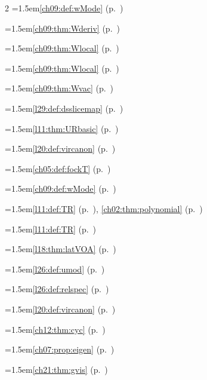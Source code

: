 \begin{multicols}{2}
\hangindent=1.5em\quad \ref{ch09:def:wMode} (p.~\pageref{ch09:def:wMode})\par
\hangindent=1.5em\quad \ref{ch09:thm:Wderiv} (p.~\pageref{ch09:thm:Wderiv})\par
\hangindent=1.5em\quad \ref{ch09:thm:Wlocal} (p.~\pageref{ch09:thm:Wlocal})\par
\hangindent=1.5em\quad \ref{ch09:thm:Wlocal} (p.~\pageref{ch09:thm:Wlocal})\par
\hangindent=1.5em\quad \ref{ch09:thm:Wvac} (p.~\pageref{ch09:thm:Wvac})\par
\hangindent=1.5em\quad \ref{l29:def:dsslicemap} (p.~\pageref{l29:def:dsslicemap})\par
\hangindent=1.5em\quad \ref{l11:thm:URbasic} (p.~\pageref{l11:thm:URbasic})\par
\hangindent=1.5em\quad \ref{l20:def:vircanon} (p.~\pageref{l20:def:vircanon})\par
\hangindent=1.5em\quad \ref{ch05:def:fockT} (p.~\pageref{ch05:def:fockT})\par
\hangindent=1.5em\quad \ref{ch09:def:wMode} (p.~\pageref{ch09:def:wMode})\par
\hangindent=1.5em\quad \ref{l11:def:TR} (p.~\pageref{l11:def:TR}), \ref{ch02:thm:polynomial} (p.~\pageref{ch02:thm:polynomial})\par
\hangindent=1.5em\quad \ref{l11:def:TR} (p.~\pageref{l11:def:TR})\par
\hangindent=1.5em\quad \ref{l18:thm:latVOA} (p.~\pageref{l18:thm:latVOA})\par
\hangindent=1.5em\quad \ref{l26:def:umod} (p.~\pageref{l26:def:umod})\par
\hangindent=1.5em\quad \ref{l26:def:relspec} (p.~\pageref{l26:def:relspec})\par
\par{}\par\nopagebreak\smallskip
\hangindent=1.5em\quad \ref{l20:def:vircanon} (p.~\pageref{l20:def:vircanon})\par
\hangindent=1.5em\quad \ref{ch12:thm:cyc} (p.~\pageref{ch12:thm:cyc})\par
\hangindent=1.5em\quad \ref{ch07:prop:eigen} (p.~\pageref{ch07:prop:eigen})\par
\hangindent=1.5em\quad \ref{ch21:thm:gvis} (p.~\pageref{ch21:thm:gvis})\par

\end{multicols}
